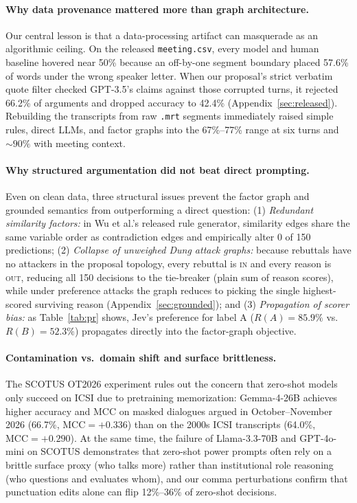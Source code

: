 \documentclass[11pt]{article}
\begin{document}
\paragraph{Why data provenance mattered more than graph architecture.}
Our central lesson is that a data-processing artifact can masquerade as an algorithmic ceiling.
On the released \texttt{meeting.csv}, every model and human baseline hovered near 50\% because an off-by-one segment boundary placed 57.6\% of words under the wrong speaker letter.
When our proposal's strict verbatim quote filter checked GPT-3.5's claims against those corrupted turns, it rejected 66.2\% of arguments and dropped accuracy to 42.4\% (Appendix~\ref{sec:released}).
Rebuilding the transcripts from raw \texttt{.mrt} segments immediately raised simple rules, direct LLMs, and factor graphs into the 67\%--77\% range at six turns and ${\sim}90\%$ with meeting context.

\paragraph{Why structured argumentation did not beat direct prompting.}
Even on clean data, three structural issues prevent the factor graph and grounded semantics from outperforming a direct question:
(1) \emph{Redundant similarity factors:} in Wu et al.'s released rule generator, similarity edges share the same variable order as contradiction edges and empirically alter 0 of 150 predictions;
(2) \emph{Collapse of unweighed Dung attack graphs:} because rebuttals have no attackers in the proposal topology, every rebuttal is \textsc{in} and every reason is \textsc{out}, reducing all 150 decisions to the tie-breaker (plain sum of reason scores), while under preference attacks the graph reduces to picking the single highest-scored surviving reason (Appendix~\ref{sec:grounded}); and
(3) \emph{Propagation of scorer bias:} as Table~\ref{tab:pr} shows, Jev's preference for label A ($R(A)=85.9\%$ vs.\ $R(B)=52.3\%$) propagates directly into the factor-graph objective.

\paragraph{Contamination vs.\ domain shift and surface brittleness.}
The SCOTUS OT2026 experiment rules out the concern that zero-shot models only succeed on ICSI due to pretraining memorization: Gemma-4-26B achieves higher accuracy and MCC on masked dialogues argued in October--November 2026 (66.7\%, $\textrm{MCC}=+0.336$) than on the 2000s ICSI transcripts (64.0\%, $\textrm{MCC}=+0.290$).
At the same time, the failure of Llama-3.3-70B and GPT-4o-mini on SCOTUS demonstrates that zero-shot power prompts often rely on a brittle surface proxy (who talks more) rather than institutional role reasoning (who questions and evaluates whom), and our comma perturbations confirm that punctuation edits alone can flip 12\%--36\% of zero-shot decisions.
\end{document}
